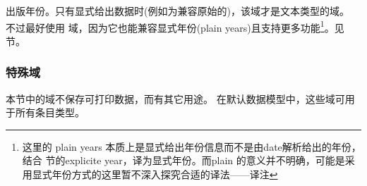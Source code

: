 \begin{fieldlist}





出版年份。只有显式给出数据时(例如为兼容原始的\bibtex)，该域才是文本类型的域。
不过最好使用  域，因为它也能兼容显式年份(plain years)且支持更多功能\footnote{这里的 plain years 本质上是显式给出年份信息而不是由date解析给出的年份，结合 节的explicite year，译为显式年份。而plain \bibtex 的意义并不明确，可能是采用显式年份方式的\bibtex 这里暂不深入探究合适的译法——译注}。见  节。



\end{fieldlist}

\subsubsection{特殊域}
\label{bib:fld:spc}


本节中的域不保存可打印数据，而有其它用途。
在默认数据模型中，这些域可用于所有条目类型。

